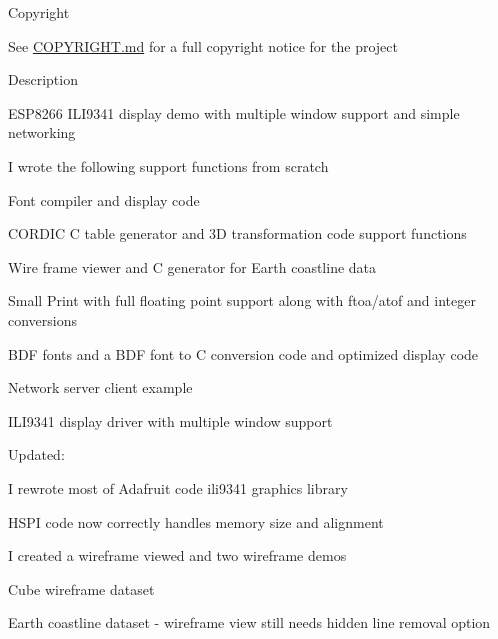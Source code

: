 \begin{DoxyParagraph}{Copyright}

\begin{DoxyItemize}
\item See \hyperlink{md_COPYRIGHT}{C\-O\-P\-Y\-R\-I\-G\-H\-T.md} for a full copyright notice for the project
\end{DoxyItemize}
\end{DoxyParagraph}
\begin{DoxyParagraph}{Description}

\begin{DoxyItemize}
\item E\-S\-P8266 I\-L\-I9341 display demo with multiple window support and simple networking
\item I wrote the following support functions from scratch
\item Font compiler and display code
\begin{DoxyItemize}
\item C\-O\-R\-D\-I\-C C table generator and 3\-D transformation code support functions
\item Wire frame viewer and C generator for Earth coastline data
\item Small Print with full floating point support along with ftoa/atof and integer conversions
\item B\-D\-F fonts and a B\-D\-F font to C conversion code and optimized display code
\item Network server client example
\item I\-L\-I9341 display driver with multiple window support
\end{DoxyItemize}
\item Updated\-:
\begin{DoxyItemize}
\item I rewrote most of Adafruit code ili9341 graphics library
\item H\-S\-P\-I code now correctly handles memory size and alignment
\end{DoxyItemize}
\item I created a wireframe viewed and two wireframe demos
\begin{DoxyItemize}
\item Cube wireframe dataset
\item Earth coastline dataset -\/ wireframe view still needs hidden line removal option
\end{DoxyItemize}
\end{DoxyItemize}
\end{DoxyParagraph}




